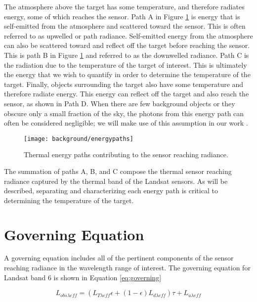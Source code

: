 \documentclass{book}
\begin{document}
The atmosphere above the target has some temperature, and therefore radiates energy, some of which reaches the sensor.  Path A in Figure \ref{fig:energypaths} is energy that is self-emitted from the atmosphere and scattered toward the sensor.  This is often referred to as upwelled or path radiance.  Self-emitted energy from the atmosphere can also be scattered toward and reflect off the target before reaching the sensor.  This is path B in Figure \ref{fig:energypaths} and referred to as the downwelled radiance.  Path C is the radiation due to the temperature of the target of interest.  This is ultimately the energy that we wish to quantify in order to determine the temperature of the target.  Finally, objects surrounding the target also have some temperature and therefore radiate energy.  This energy can reflect off the target and also reach the sensor, as shown in Path D.  When there are few background objects or they obscure only a small fraction of the sky, the photons from this energy path can often be considered negligible; we will make use of this assumption in our work \cite{schott}.  

\begin{figure}%
\centering
\texttt{[image: background/energypaths]}
\caption{Thermal energy paths contributing to the sensor reaching radiance.}
\label{fig:energypaths}
\end{figure}

The summation of paths A, B, and C compose the thermal sensor reaching radiance captured by the thermal band of the Landsat sensors.  As will be described, separating and characterizing each energy path is critical to determining the temperature of the target.

\section{Governing Equation}
\label{sec:governingequation}

A governing equation includes all of the pertinent components of the sensor reaching radiance in the wavelength range of interest.  The governing equation for Landsat band 6 is shown in Equation \ref{eq:governing}

\begin{equation}
L_{obs{{\lambda}eff}} = (L_{T{{\lambda}eff}}\epsilon+(1-\epsilon)L_{d{\lambda}eff})\tau + L_{u{\lambda}eff}
\label{eq:governing}
\end{equation}
\end{document}
